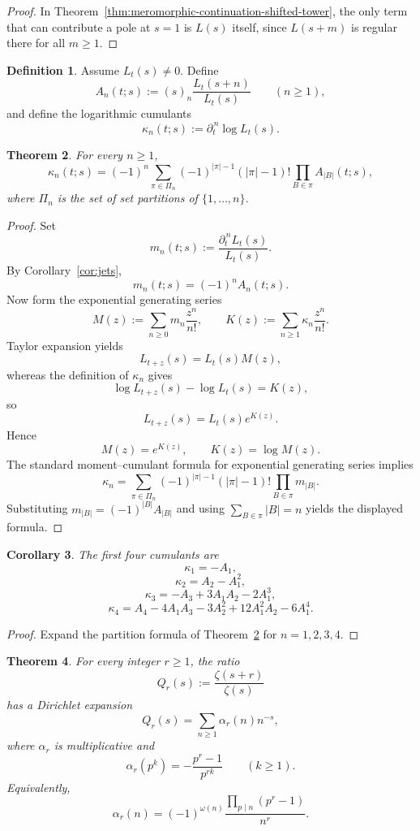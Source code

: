 \documentclass[11pt]{amsart}
\numberwithin{equation}{section}
\newtheorem{theorem}{Theorem}[section]
\newtheorem{corollary}[theorem]{Corollary}
\theoremstyle{definition}
\newtheorem{definition}[theorem]{Definition}
\begin{document}
\begin{proof}
In Theorem~\ref{thm:meromorphic-continuation-shifted-tower}, the only term that can contribute a pole at $s=1$ is $L(s)$ itself, since $L(s+m)$ is regular there for all $m\ge1$. 
\end{proof}

\begin{definition}\label{def:cumulants}
Assume $L_t(s)\neq0$. Define
\[
A_n(t;s):=(s)_n\frac{L_t(s+n)}{L_t(s)}
\qquad(n\ge1),
\]
and define the logarithmic cumulants
\[
\kappa_n(t;s):=\partial_t^{\,n}\log L_t(s).
\]
\end{definition}

\begin{theorem}\label{thm:cumulant-partition-formula}
For every $n\ge1$,
\[
\boxed{
\kappa_n(t;s)
=
(-1)^n
\sum_{\pi\in\Pi_n}
(-1)^{|\pi|-1}(|\pi|-1)!
\prod_{B\in\pi}A_{|B|}(t;s),
}
\]
where $\Pi_n$ is the set of set partitions of $\{1,\dots,n\}$.
\end{theorem}

\begin{proof}
Set
\[
m_n(t;s):=\frac{\partial_t^{\,n}L_t(s)}{L_t(s)}.
\]
By Corollary~\ref{cor:jets},
\[
m_n(t;s)=(-1)^nA_n(t;s).
\]
Now form the exponential generating series
\[
M(z):=\sum_{n\ge0}m_n\frac{z^n}{n!},
\qquad
K(z):=\sum_{n\ge1}\kappa_n\frac{z^n}{n!}.
\]
Taylor expansion yields
\[
L_{t+z}(s)=L_t(s)M(z),
\]
whereas the definition of $\kappa_n$ gives
\[
\log L_{t+z}(s)-\log L_t(s)=K(z),
\]
so
\[
L_{t+z}(s)=L_t(s)e^{K(z)}.
\]
Hence
\[
M(z)=e^{K(z)},
\qquad
K(z)=\log M(z).
\]
The standard moment--cumulant formula for exponential generating series implies
\[
\kappa_n=
\sum_{\pi\in\Pi_n}
(-1)^{|\pi|-1}(|\pi|-1)!
\prod_{B\in\pi}m_{|B|}.
\]
Substituting $m_{|B|}=(-1)^{|B|}A_{|B|}$ and using $\sum_{B\in\pi}|B|=n$ yields the displayed formula. 
\end{proof}

\begin{corollary}\label{cor:first-four-cumulants}
The first four cumulants are
\[
\kappa_1=-A_1,
\]
\[
\kappa_2=A_2-A_1^2,
\]
\[
\kappa_3=-A_3+3A_1A_2-2A_1^3,
\]
\[
\kappa_4=A_4-4A_1A_3-3A_2^2+12A_1^2A_2-6A_1^4.
\]
\end{corollary}

\begin{proof}
Expand the partition formula of Theorem~\ref{thm:cumulant-partition-formula} for $n=1,2,3,4$. 
\end{proof}

\begin{theorem}\label{thm:arithmetic-kernels-riemann}
For every integer $r\ge1$, the ratio
\[
Q_r(s):=\frac{\zeta(s+r)}{\zeta(s)}
\]
has a Dirichlet expansion
\[
Q_r(s)=\sum_{n\ge1}\alpha_r(n)n^{-s},
\]
where $\alpha_r$ is multiplicative and
\[
\alpha_r(p^k)=-\frac{p^r-1}{p^{rk}}
\qquad(k\ge1).
\]
Equivalently,
\[
\boxed{
\alpha_r(n)=(-1)^{\omega(n)}\frac{\prod_{p\mid n}(p^r-1)}{n^r}.
}
\]
\end{theorem}
\end{document}
